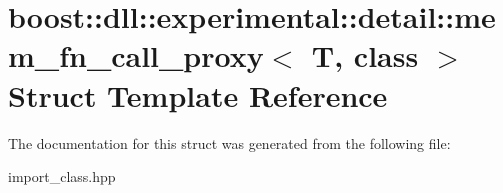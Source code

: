 \hypertarget{a00216}{}\section{boost\+:\+:dll\+:\+:experimental\+:\+:detail\+:\+:mem\+\_\+fn\+\_\+call\+\_\+proxy$<$ T, class $>$ Struct Template Reference}
\label{a00216}


The documentation for this struct was generated from the following file\+:\begin{DoxyCompactItemize}
\item 
import\+\_\+class.\+hpp\end{DoxyCompactItemize}
